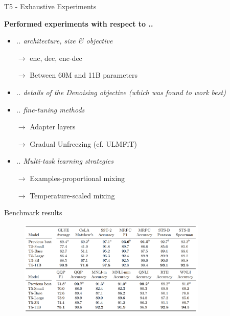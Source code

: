 \begin{frame}{T5 - Exhaustive Experiments}

\vfill

	\textbf{Performed experiments with respect to ..}
	
	\begin{itemize}
		\item \textit{.. architecture, size \& objective}
		\item[$\to$] enc, dec, enc-dec
		\item[$\to$] Between 60M and 11B parameters
		\item \textit{.. details of the Denoising objective (which was found to work best)}
		\item \textit{.. fine-tuning methods}
		\item[$\to$] Adapter layers
		\item[$\to$] Gradual Unfreezing (cf. ULMFiT)
		\item \textit{.. Multi-task learning strategies}
		\item[$\to$] Examples-proportional mixing
		\item[$\to$] Temperature-scaled mixing
	\end{itemize}
	
\vfill

\end{frame}


\begin{frame}{Benchmark results}

\vfill

	\begin{figure}
		\centering
		\includegraphics[width = 9cm]{figure/63-t5-glue.png}\\ 
	\end{figure}
	
\vfill

\end{frame}

